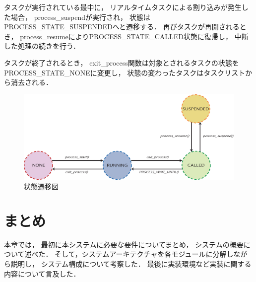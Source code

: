 タスクが実行されている最中に，
リアルタイムタスクによる割り込みが発生した場合，
process\_suspendが実行され，
状態はPROCESS\_STATE\_SUSPENDEDへと遷移する．
再びタスクが再開されるとき，
process\_resumeによりPROCESS\_STATE\_CALLED状態に復帰し，
中断した処理の続きを行う．

タスクが終了されるとき，
exit\_process関数は対象とされるタスクの状態を
PROCESS\_STATE\_NONEに変更し，
状態の変わったタスクはタスクリストから消去される．

\clearpage



\begin{figure}[htbp]
 \begin{center}
  \includegraphics[width=130mm]{./images/state_transition.eps}
 \end{center}
 \caption{状態遷移図}
 \label{fig:state_transition}
\end{figure}


\section{まとめ}
本章では，
最初に本システムに必要な要件についてまとめ，
システムの概要について述べた．
そして，システムアーキテクチャを各モジュールに分解しながら説明し，
システム構成について考察した．
最後に実装環境など実装に関する内容について言及した．



